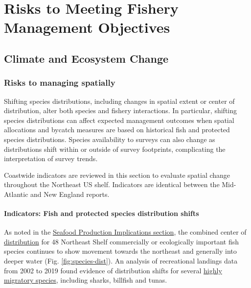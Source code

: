 \documentclass[
  10pt,
]{article}
\begin{document}
\section{Risks to Meeting Fishery Management Objectives}\label{risks-to-meeting-fishery-management-objectives}

\subsection{Climate and Ecosystem Change}\label{climate-and-ecosystem-change}

\subsubsection{Risks to managing spatially}\label{risks-to-managing-spatially}

Shifting species distributions, including changes in spatial extent or center of distribution, alter both species and fishery interactions. In particular, shifting species distributions can affect expected management outcomes when spatial allocations and bycatch measures are based on historical fish and protected species distributions. Species availability to surveys can also change as distributions shift within or outside of survey footprints, complicating the interpretation of survey trends.

Coastwide indicators are reviewed in this section to evaluate spatial change throughout the Northeast US shelf. Indicators are identical between the Mid-Atlantic and New England reports.

\paragraph{Indicators: Fish and protected species distribution shifts}\label{indicators-fish-and-protected-species-distribution-shifts}

As noted in the \hyperref[implications]{Seafood Production Implications section}, the combined center of \href{https://noaa-edab.github.io/catalog/species_dist.html}{distribution} for 48 Northeast Shelf commercially or ecologically important fish species continues to show movement towards the northeast and generally into deeper water (Fig. \ref{fig:species-dist}). An analysis of recreational landings data from 2002 to 2019 found evidence of distribution shifts for several \href{https://noaa-edab.github.io/catalog/species_dist.html}{highly migratory species}, including sharks, billfish and tunas.
\end{document}
